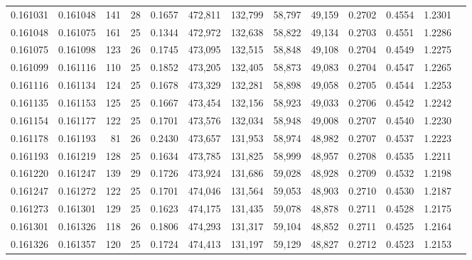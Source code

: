 \begin{tabular}{rrrrrrrrrrrrr}
0.161031 & 0.161048 & 141 &  28 &                                     0.1657 & 472,811 & 132,799 &  58,797 &  49,159 & 0.2702 & 0.4554 & 1.2301 \\
0.161048 & 0.161075 & 161 &  25 &                                     0.1344 & 472,972 & 132,638 &  58,822 &  49,134 & 0.2703 & 0.4551 & 1.2286 \\
0.161075 & 0.161098 & 123 &  26 &                                     0.1745 & 473,095 & 132,515 &  58,848 &  49,108 & 0.2704 & 0.4549 & 1.2275 \\
0.161099 & 0.161116 & 110 &  25 &                                     0.1852 & 473,205 & 132,405 &  58,873 &  49,083 & 0.2704 & 0.4547 & 1.2265 \\
0.161116 & 0.161134 & 124 &  25 &                                     0.1678 & 473,329 & 132,281 &  58,898 &  49,058 & 0.2705 & 0.4544 & 1.2253 \\
0.161135 & 0.161153 & 125 &  25 &                                     0.1667 & 473,454 & 132,156 &  58,923 &  49,033 & 0.2706 & 0.4542 & 1.2242 \\
0.161154 & 0.161177 & 122 &  25 &                                     0.1701 & 473,576 & 132,034 &  58,948 &  49,008 & 0.2707 & 0.4540 & 1.2230 \\
0.161178 & 0.161193 &  81 &  26 &                                     0.2430 & 473,657 & 131,953 &  58,974 &  48,982 & 0.2707 & 0.4537 & 1.2223 \\
0.161193 & 0.161219 & 128 &  25 &                                     0.1634 & 473,785 & 131,825 &  58,999 &  48,957 & 0.2708 & 0.4535 & 1.2211 \\
0.161220 & 0.161247 & 139 &  29 &                                     0.1726 & 473,924 & 131,686 &  59,028 &  48,928 & 0.2709 & 0.4532 & 1.2198 \\
0.161247 & 0.161272 & 122 &  25 &                                     0.1701 & 474,046 & 131,564 &  59,053 &  48,903 & 0.2710 & 0.4530 & 1.2187 \\
0.161273 & 0.161301 & 129 &  25 &                                     0.1623 & 474,175 & 131,435 &  59,078 &  48,878 & 0.2711 & 0.4528 & 1.2175 \\
0.161301 & 0.161326 & 118 &  26 &                                     0.1806 & 474,293 & 131,317 &  59,104 &  48,852 & 0.2711 & 0.4525 & 1.2164 \\
0.161326 & 0.161357 & 120 &  25 &                                     0.1724 & 474,413 & 131,197 &  59,129 &  48,827 & 0.2712 & 0.4523 & 1.2153 \\

\end{tabular}
